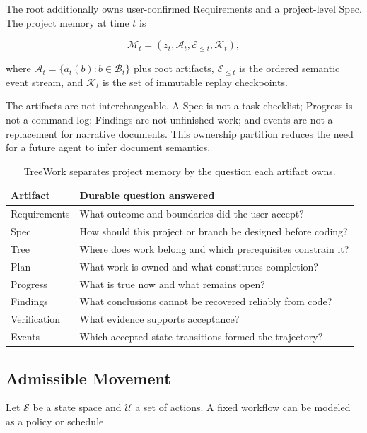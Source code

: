 \documentclass[11pt]{article}
\newcommand{\M}{\mathcal{M}}
\newcommand{\B}{\mathcal{B}}
\newcommand{\E}{\mathcal{E}}
\newcommand{\A}{\mathcal{A}}
\newcommand{\K}{\mathcal{K}}
\theoremstyle{definition}
\begin{document}
The root additionally owns user-confirmed Requirements and a project-level
Spec.  The project memory at time $t$ is

\begin{equation}
  \M_t=
  \left(
    z_t,
    \A_t,
    \E_{\leq t},
    \K_t
  \right),
  \label{eq:memory-state}
\end{equation}

where $\A_t=\{a_t(b):b\in\B_t\}$ plus root artifacts,
$\E_{\leq t}$ is the ordered semantic event stream, and $\K_t$ is the set of
immutable replay checkpoints.

The artifacts are not interchangeable.  A Spec is not a task checklist;
Progress is not a command log; Findings are not unfinished work; and events are
not a replacement for narrative documents.  This ownership partition reduces
the need for a future agent to infer document semantics.

\begin{table}[t]
\centering
\small
\begin{tabularx}{\linewidth}{@{}lX@{}}
\toprule
Artifact & Durable question answered \\
\midrule
Requirements & What outcome and boundaries did the user accept? \\
Spec & How should this project or branch be designed before coding? \\
Tree & Where does work belong and which prerequisites constrain it? \\
Plan & What work is owned and what constitutes completion? \\
Progress & What is true now and what remains open? \\
Findings & What conclusions cannot be recovered reliably from code? \\
Verification & What evidence supports acceptance? \\
Events & Which accepted state transitions formed the trajectory? \\
\bottomrule
\end{tabularx}
\caption{TreeWork separates project memory by the question each artifact owns.}
\label{tab:artifact-ownership}
\end{table}

\subsection{Admissible Movement}

Let $\mathcal{S}$ be a state space and $\mathcal{U}$ a set of actions.  A fixed
workflow can be modeled as a policy or schedule
\end{document}

